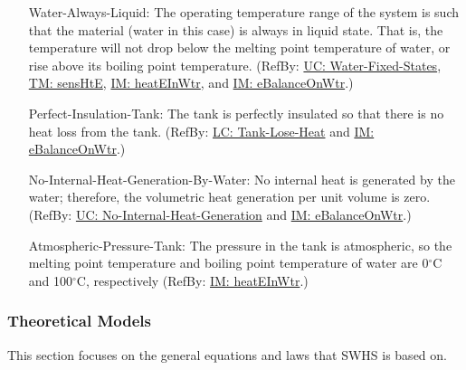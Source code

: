 \documentclass[12pt]{article}
\begin{document}
\begin{itemize}
\item[Water-Always-Liquid:\phantomsection\label{assumpWAL}]The operating temperature range of the system is such that the material (water in this case) is always in liquid state. That is, the temperature will not drop below the melting point temperature of water, or rise above its boiling point temperature. (RefBy: \hyperref[unlikeChgWFS]{UC: Water-Fixed-States}, \hyperref[TM:sensHtE]{TM: sensHtE}, \hyperref[IM:heatEInWtr]{IM: heatEInWtr}, and \hyperref[IM:eBalanceOnWtr]{IM: eBalanceOnWtr}.)
\item[Perfect-Insulation-Tank:\phantomsection\label{assumpPIT}]The tank is perfectly insulated so that there is no heat loss from the tank. (RefBy: \hyperref[likeChgTLH]{LC: Tank-Lose-Heat} and \hyperref[IM:eBalanceOnWtr]{IM: eBalanceOnWtr}.)
\item[No-Internal-Heat-Generation-By-Water:\phantomsection\label{assumpNIHGBW}]No internal heat is generated by the water; therefore, the volumetric heat generation per unit volume is zero. (RefBy: \hyperref[unlikeChgNIHG]{UC: No-Internal-Heat-Generation} and \hyperref[IM:eBalanceOnWtr]{IM: eBalanceOnWtr}.)
\item[Atmospheric-Pressure-Tank:\phantomsection\label{assumpAPT}]The pressure in the tank is atmospheric, so the melting point temperature and boiling point temperature of water are 0${}^{\circ}$C and 100${}^{\circ}$C, respectively (RefBy: \hyperref[IM:heatEInWtr]{IM: heatEInWtr}.)
\end{itemize}
\subsubsection{Theoretical Models}
\label{Sec:TMs}
This section focuses on the general equations and laws that SWHS is based on.
\end{document}

